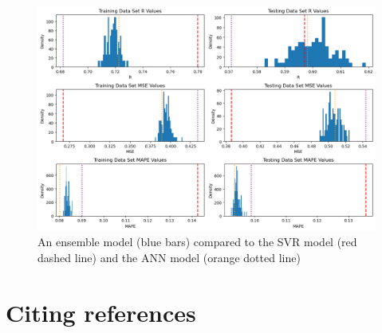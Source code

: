 \documentclass{article}
\begin{document}
\begin{figure}
	\centering
	\includegraphics[width=\linewidth]{figures/ensemble_model_results.png}
	\caption{An ensemble model (blue bars) compared to the SVR model (red dashed line) and the ANN model (orange dotted line)}
	\label{fig:ensemble-model}
\end{figure}

\section{Citing references}


\end{document}
